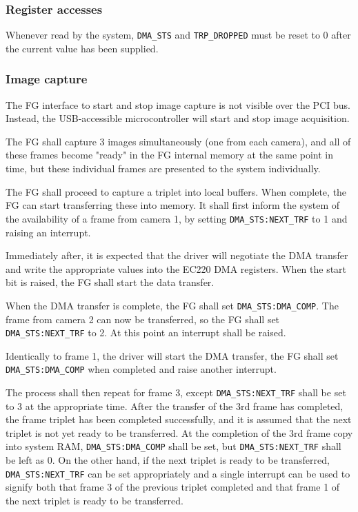 \documentclass[12pt]{article}
\begin{document}
\subsubsection{Register accesses}

Whenever read by the system, \texttt{DMA\_STS} and \texttt{TRP\_DROPPED} must be reset to 0 after the current value has been supplied.

\subsubsection{Image capture}

The FG interface to start and stop image capture is not visible over the PCI bus. Instead, the USB-accessible microcontroller will start and stop image acquisition.

The FG shall capture 3 images simultaneously (one from each camera), and all of
these frames become "ready" in the FG internal memory at the same point in time, but these individual frames are presented to the system individually.

The FG shall proceed to capture a triplet into local buffers. When complete, the FG can start transferring these into memory. It shall first inform the system of the availability of a frame from camera 1, by setting \texttt{DMA\_STS:NEXT\_TRF} to 1 and raising an interrupt.

Immediately after, it is expected that the driver will negotiate the DMA transfer and write the appropriate values into the EC220 DMA registers. When the start bit is raised, the FG shall start the data transfer.

When the DMA transfer is complete, the FG shall set \texttt{DMA\_STS:DMA\_COMP}. The frame from camera 2 can now be transferred, so the FG shall set \texttt{DMA\_STS:NEXT\_TRF} to 2. At this point an interrupt shall be raised.

Identically to frame 1, the driver will start the DMA transfer, the FG shall set \texttt{DMA\_STS:DMA\_COMP} when completed and raise another interrupt.

The process shall then repeat for frame 3, except \texttt{DMA\_STS:NEXT\_TRF} shall be set to 3 at the appropriate time. After the transfer of the 3rd frame has completed, the frame triplet has been completed successfully, and it is assumed that the next triplet is not yet ready to be transferred. At the completion of the 3rd frame copy into system RAM, \texttt{DMA\_STS:DMA\_COMP} shall be set, but \texttt{DMA\_STS:NEXT\_TRF} shall be left as 0. On the other hand, if the next triplet is ready to be transferred, \texttt{DMA\_STS:NEXT\_TRF} can be set appropriately and a single interrupt can be used to signify both that frame 3 of the previous triplet completed and that frame 1 of the next triplet is ready to be transferred.
\end{document}
